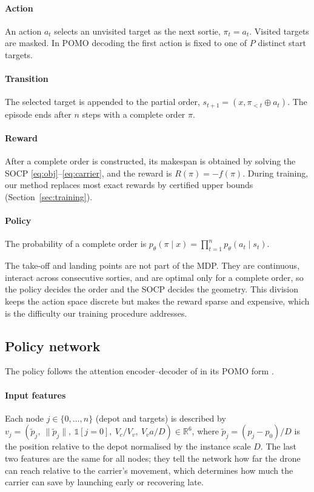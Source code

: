 \documentclass[preprint,review,12pt,authoryear]{elsarticle}
\newcommand{\R}{\mathbb{R}}
\begin{document}
\paragraph{Action} An action $a_t$ selects an unvisited target as the next sortie, $\pi_t=a_t$. Visited targets
are masked. In POMO decoding the first action is fixed to one of $P$ distinct start targets.

\paragraph{Transition} The selected target is appended to the partial order, $s_{t+1}=(x,\pi_{<t}\oplus a_t)$.
The episode ends after $n$ steps with a complete order $\pi$.

\paragraph{Reward} After a complete order is constructed, its makespan is obtained by solving the SOCP
\eqref{eq:obj}--\eqref{eq:carrier}, and the reward is $R(\pi)=-f(\pi)$. During training, our method replaces
most exact rewards by certified upper bounds (Section~\ref{sec:training}).

\paragraph{Policy} The probability of a complete order is $p_\theta(\pi\mid x)=\prod_{t=1}^{n}p_\theta(a_t\mid s_t)$.

The take-off and landing points are not part of the MDP. They are continuous, interact across consecutive
sorties, and are optimal only for a complete order, so the policy decides the order and the SOCP decides the
geometry. This division keeps the action space discrete but makes the reward sparse and expensive, which is the
difficulty our training procedure addresses.

\subsection{Policy network}\label{sec:policy}
The policy follows the attention encoder--decoder of \citet{kool2019attention} in its POMO form
\citep{kwon2020pomo}.

\paragraph{Input features} Each node $j\in\{0,\dots,n\}$ (depot and targets) is described by
$v_j=(\tilde p_j,\ \|\tilde p_j\|,\ \mathbb{1}[j=0],\ V_c/V_v,\ V_v a/D)\in\R^6$, where
$\tilde p_j=(p_j-p_0)/D$ is the position relative to the depot normalised by the instance scale $D$. The last two
features are the same for all nodes; they tell the network how far the drone can reach relative to the carrier's
movement, which determines how much the carrier can save by launching early or recovering late.
\end{document}
